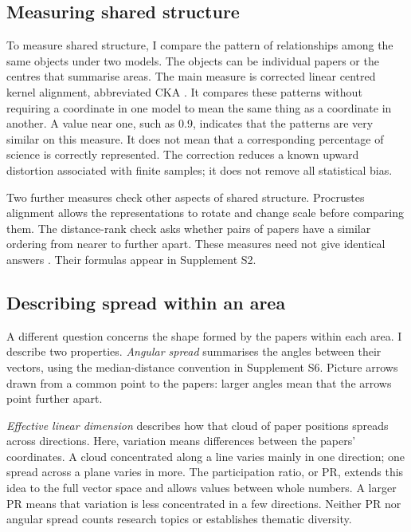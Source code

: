 \documentclass[12pt]{article}
\begin{document}
\subsection{Measuring shared structure}
To measure shared structure, I compare the pattern of relationships among the same objects under two models. The objects can be individual papers or the centres that summarise areas. The main measure is corrected linear centred kernel alignment, abbreviated CKA \citep{pmlr-v97-kornblith19a,refa961d84a4e}. It compares these patterns without requiring a coordinate in one model to mean the same thing as a coordinate in another. A value near one, such as 0.9, indicates that the patterns are very similar on this measure. It does not mean that a corresponding percentage of science is correctly represented. The correction reduces a known upward distortion associated with finite samples; it does not remove all statistical bias.

Two further measures check other aspects of shared structure. Procrustes alignment allows the representations to rotate and change scale before comparing them. The distance-rank check asks whether pairs of papers have a similar ordering from nearer to further apart. These measures need not give identical answers \citep{NEURIPS2021_252a3dba,pmlr-v285-williams24a}. Their formulas appear in Supplement S2.

\subsection{Describing spread within an area}
A different question concerns the shape formed by the papers within each area. I describe two properties. \emph{Angular spread} summarises the angles between their vectors, using the median-distance convention in Supplement S6. Picture arrows drawn from a common point to the papers: larger angles mean that the arrows point further apart.

\emph{Effective linear dimension} describes how that cloud of paper positions spreads across directions. Here, variation means differences between the papers' coordinates. A cloud concentrated along a line varies mainly in one direction; one spread across a plane varies in more. The participation ratio, or PR, extends this idea to the full vector space and allows values between whole numbers. A larger PR means that variation is less concentrated in a few directions. Neither PR nor angular spread counts research topics or establishes thematic diversity.
\end{document}
